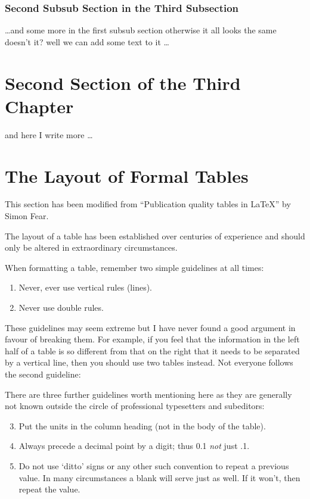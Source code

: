 \subsubsection{Second Subsub Section in the Third Subsection}
\dots and some more in the first subsub section otherwise it all looks the same
doesn't it? well we can add some text to it \dots

\section{Second Section of the Third Chapter}
and here I write more \dots

\section{The Layout of Formal Tables}
This section has been modified from ``Publication quality tables in \LaTeX*''
 by Simon Fear.

The layout of a table has been established over centuries of experience and
should only be altered in extraordinary circumstances.

When formatting a table, remember two simple guidelines at all times:

\begin{enumerate}
  \item Never, ever use vertical rules (lines).
  \item Never use double rules.
\end{enumerate}

These guidelines may seem extreme but I have
never found a good argument in favour of breaking them. For
example, if you feel that the information in the left half of
a table is so different from that on the right that it needs
to be separated by a vertical line, then you should use two
tables instead. Not everyone follows the second guideline:

There are three further guidelines worth mentioning here as they
are generally not known outside the circle of professional
typesetters and subeditors:

\begin{enumerate}\setcounter{enumi}{2}
  \item Put the units in the column heading (not in the body of
          the table).
  \item Always precede a decimal point by a digit; thus 0.1
      {\em not} just .1.
  \item Do not use `ditto' signs or any other such convention to
      repeat a previous value. In many circumstances a blank
      will serve just as well. If it won't, then repeat the value.
\end{enumerate}

